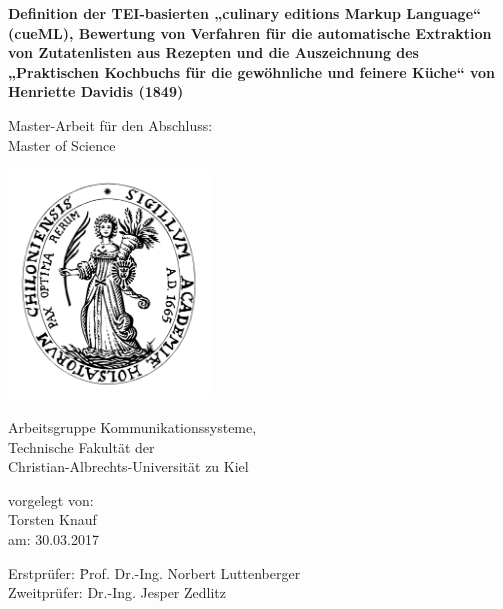 \documentclass[12pt, twoside]{report}
\begin{document}
\begin{titlepage}
    \begin{center}
		\Large{
			\textbf{Definition der TEI-basierten „culinary editions Markup Language“ (cueML), Bewertung von Verfahren für die automatische Extraktion von Zutatenlisten aus Rezepten und die Auszeichnung des „Praktischen Kochbuchs für die gewöhnliche und feinere Küche“ von Henriette Davidis (1849)}
		}
		\vspace{0.5cm}
		
        \large
        Master-Arbeit für den Abschluss:\\
        Master of Science
        
        \vspace{0.5cm}
        
        \includegraphics[width=0.4\textwidth]{Images/cau-siegel.pdf}
        
        Arbeitsgruppe Kommunikationssysteme,\\
        Technische Fakultät der\\
        Christian-Albrechts-Universität zu Kiel\\
        
        \vspace{1cm}
        
            \large vorgelegt von:\\
            \Large Torsten Knauf\\
            \large am: 30.03.2017
    \end{center}
    
    \vspace{1cm}
    
    \Large
    \begin{tabbing}
    Erstprüfer:\hspace{0.5cm} \= Prof. Dr.-Ing. Norbert Luttenberger\\
    Zweitprüfer: \> Dr.-Ing. Jesper Zedlitz
    \end{tabbing}
\end{titlepage}
\end{document}
